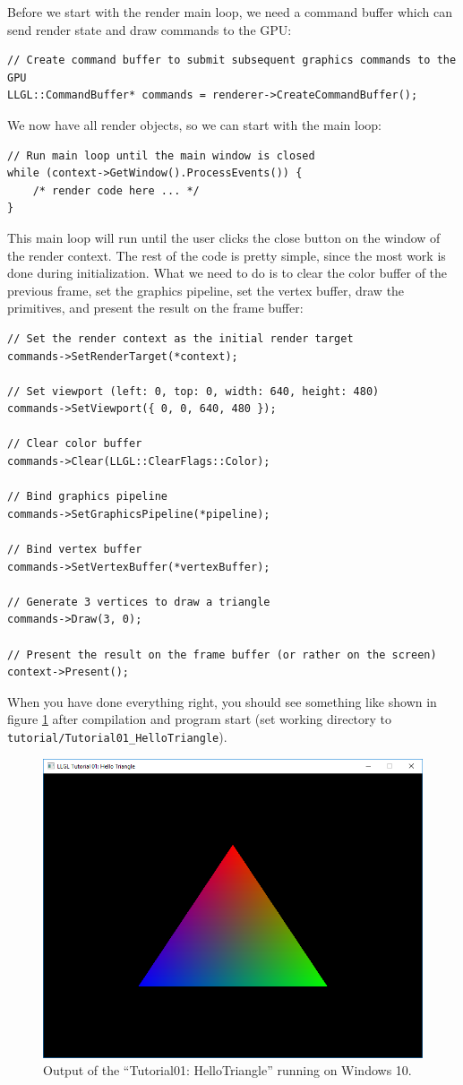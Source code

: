 \documentclass{article}
\begin{document}
Before we start with the render main loop, we need a command buffer which can send render state and draw commands to the GPU:
\begin{lstlisting}
// Create command buffer to submit subsequent graphics commands to the GPU
LLGL::CommandBuffer* commands = renderer->CreateCommandBuffer();
\end{lstlisting}
We now have all render objects, so we can start with the main loop:
\begin{lstlisting}
// Run main loop until the main window is closed
while (context->GetWindow().ProcessEvents()) {
    /* render code here ... */
}
\end{lstlisting}
This main loop will run until the user clicks the close button on the window of the render context.
The rest of the code is pretty simple, since the most work is done during initialization.
What we need to do is to clear the color buffer of the previous frame,
set the graphics pipeline, set the vertex buffer, draw the primitives, and present the result on the frame buffer:
\begin{lstlisting}
// Set the render context as the initial render target
commands->SetRenderTarget(*context);

// Set viewport (left: 0, top: 0, width: 640, height: 480)
commands->SetViewport({ 0, 0, 640, 480 });

// Clear color buffer
commands->Clear(LLGL::ClearFlags::Color);

// Bind graphics pipeline
commands->SetGraphicsPipeline(*pipeline);

// Bind vertex buffer
commands->SetVertexBuffer(*vertexBuffer);

// Generate 3 vertices to draw a triangle
commands->Draw(3, 0);

// Present the result on the frame buffer (or rather on the screen)
context->Present();
\end{lstlisting}
When you have done everything right, you should see something like shown in figure \ref{fig:tut01_mask1} after compilation
and program start (set working directory to \texttt{tutorial/Tutorial01\_HelloTriangle}).
\begin{figure}[H]
	\centering
	\includegraphics[width=0.9 \textwidth]{tut01_mask1a}
	\caption{Output of the ``Tutorial01: HelloTriangle'' running on Windows 10.}
	\label{fig:tut01_mask1}
\end{figure}
\end{document}

